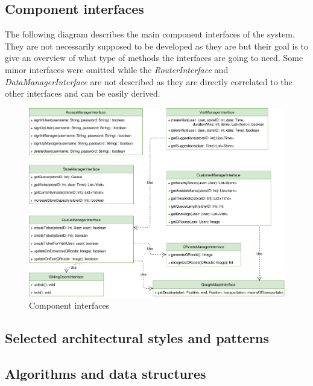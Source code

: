 \documentclass[]{article}
\begin{document}
	\subsection{Component interfaces}
	
	The following diagram describes the main component interfaces of the system. \newline
	They are not necessarily supposed to be developed as they are but their goal is to give an overview of what type of methods the interfaces are going to need. \newline
	Some minor interfaces were omitted while the \textit{RouterInterface} and \textit{DataManagerInterface} are not described as they are directly correlated to the other interfaces and can be easily derived. \newline
	
		\begin{figure}[H]
			\centering
			\includegraphics[scale=0.7]{ComponentView/componentInterfaces.png}
			\caption{Component interfaces}
			\label{fig:componentInterfaces}
		\end{figure}
	
	
	\subsection{Selected architectural styles and patterns}
	
	\subsection{Algorithms and data structures}
\end{document}
